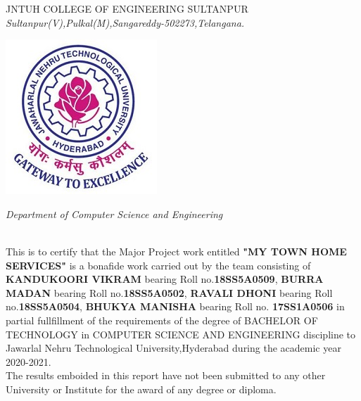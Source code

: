 \documentclass[12pt,a4paper]{report}
\begin{document}
\newpage
\begin{titlepage}
\begin{center}
\begin{large}
            \textsc{\large JNTUH COLLEGE OF ENGINEERING SULTANPUR}
            \textit{\large Sultanpur(V),Pulkal(M),Sangareddy-502273,Telangana.}\\[0.25]
            
\end{large}
\begin{center}
    \includegraphics[scale=0.6]{logoj}
    \end{center}
    \textit{\large Department of Computer Science and Engineering}\\ 
    \vspace{1cm}
\textit{\large{}}\\[1.25]    
\end{center}
\vspace{0.5cm}
{\large This is to certify that the Major Project work entitled \textbf{"MY TOWN HOME SERVICES"} is a bonafide work carried out by the team consisting of  \textbf{KANDUKOORI VIKRAM} bearing Roll no.\textbf{18SS5A0509}, \textbf{BURRA MADAN} bearing Roll no.\textbf{18SS5A0502}, \textbf{RAVALI DHONI} bearing Roll no.\textbf{18SS5A0504}, \textbf{BHUKYA MANISHA} bearing Roll no. \textbf{17SS1A0506} in partial fullfillment of the requirements of  the degree of \textup{BACHELOR OF TECHNOLOGY} in \textup{COMPUTER SCIENCE AND ENGINEERING} discipline to Jawarlal Nehru Technological University,Hyderabad during the academic year 2020-2021.\\
The results emboided in this report have not been submitted to any other University or Institute for the award of any degree or diploma.}\\


\end{titlepage}
\end{document}
